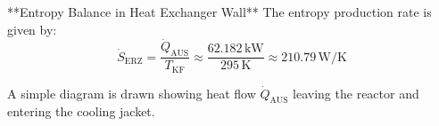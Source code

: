 **Entropy Balance in Heat Exchanger Wall**  
The entropy production rate is given by:  
\[
\dot{S}_{\text{ERZ}} = \frac{\dot{Q}_{\text{AUS}}}{T_{\text{KF}}} \approx \frac{62.182 \, \text{kW}}{295 \, \text{K}} \approx 210.79 \, \text{W/K}
\]  

A simple diagram is drawn showing heat flow \( \dot{Q}_{\text{AUS}} \) leaving the reactor and entering the cooling jacket.